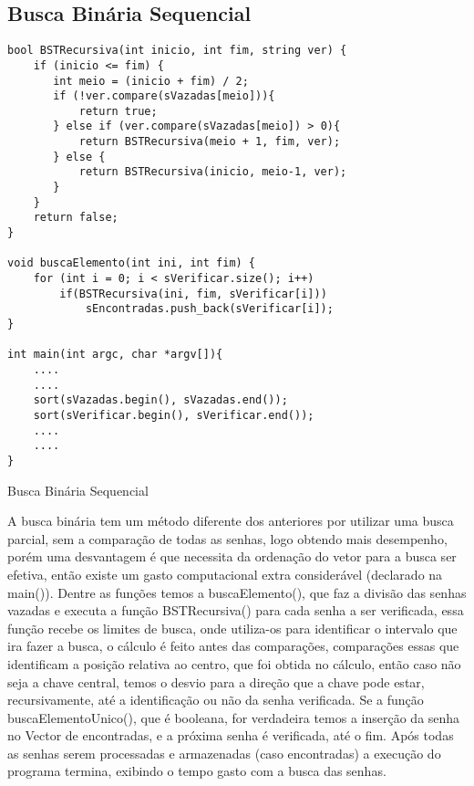 \documentclass[10pt,journal,compsoc]{IEEEtran}
\begin{document}
\subsection{Busca Binária Sequencial}

\begin{listing}[ht]
\begin{verbatim}
bool BSTRecursiva(int inicio, int fim, string ver) {
    if (inicio <= fim) {
       int meio = (inicio + fim) / 2;
       if (!ver.compare(sVazadas[meio])){ 
           return true;
       } else if (ver.compare(sVazadas[meio]) > 0){
           return BSTRecursiva(meio + 1, fim, ver);
       } else { 
           return BSTRecursiva(inicio, meio-1, ver);
       }
    }
    return false;
}

void buscaElemento(int ini, int fim) {
    for (int i = 0; i < sVerificar.size(); i++)
        if(BSTRecursiva(ini, fim, sVerificar[i]))
            sEncontradas.push_back(sVerificar[i]);
}

int main(int argc, char *argv[]){
    ....
    ....
    sort(sVazadas.begin(), sVazadas.end());
    sort(sVerificar.begin(), sVerificar.end());
    ....
    ....
}
\end{verbatim}
\caption{Busca Binária Sequencial}
\label{listing:4}
\end{listing}

	A busca binária tem um método diferente dos anteriores por utilizar uma busca parcial, sem a comparação de todas as senhas, logo obtendo mais desempenho, porém uma desvantagem é que necessita da ordenação do vetor para a busca ser efetiva, então existe um gasto computacional extra considerável (declarado na main()). Dentre as funções temos a buscaElemento(), que faz a divisão das senhas vazadas e executa a função BSTRecursiva() para cada senha a ser verificada, essa função recebe os limites de busca, onde utiliza-os para identificar o intervalo que ira fazer a busca, o cálculo é feito antes das comparações, comparações essas que identificam a posição relativa ao centro, que foi obtida no cálculo, então caso não seja a chave central, temos o desvio para a direção que a chave pode estar, recursivamente, até a identificação ou não da senha verificada. Se a função buscaElementoUnico(), que é booleana, for verdadeira temos a inserção da senha no Vector de encontradas, e a próxima senha é verificada, até o fim. Após todas as senhas serem processadas e armazenadas (caso encontradas) a execução do programa termina, exibindo o tempo gasto com a busca das senhas.
\end{document}
